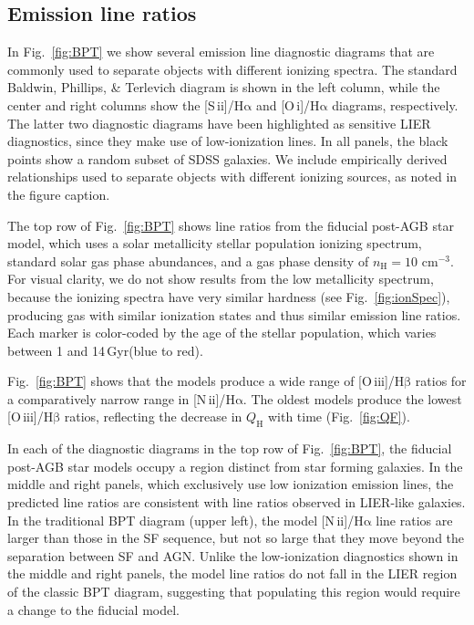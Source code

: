 \documentclass[preprint2]{aastex62}
\newcommand{\nii}{[N\,{\sc ii}]\xspace}
\newcommand{\sii}{[S\,{\sc ii}]\xspace}
\newcommand{\oiii}{[O\,{\sc iii}]\xspace}
\newcommand{\oi}{[O\,{\sc i}]\xspace}
\newcommand{\ha}{\ensuremath{\mathrm{H\alpha}}\xspace}
\newcommand{\hb}{\ensuremath{\mathrm{H\beta}}\xspace}
\newcommand{\QH}{\ensuremath{Q_{\mathrm{H}}}\xspace}
\newcommand{\Gyr}{$\,$Gyr\xspace}
\begin{document}
\subsection{Emission line ratios} \label{sec:stars:ratios}

In Fig.~\ref{fig:BPT} we show several emission line diagnostic diagrams that are commonly used to separate objects with different ionizing spectra. The standard Baldwin, Phillips, \& Terlevich \citep[BPT;][]{BPT} diagram is shown in the left column, while the center and right columns show the \sii/\ha and \oi/\ha diagrams, respectively. The latter two diagnostic diagrams have been highlighted as sensitive LIER diagnostics, since they make use of low-ionization lines. In all panels, the black points show a random subset of SDSS galaxies. We include empirically derived relationships used to separate objects with different ionizing sources, as noted in the figure caption. 

The top row of Fig.~\ref{fig:BPT} shows line ratios from the fiducial post-AGB star model, which uses a solar metallicity stellar population ionizing spectrum, standard solar gas phase abundances, and a gas phase density of $n_{\mathrm{H}}=10$ cm$^{-3}$. For visual clarity, we do not show results from the low metallicity spectrum, because the ionizing spectra have very similar hardness (see Fig.~\ref{fig:ionSpec}), producing gas with similar ionization states and thus similar emission line ratios. Each marker is color-coded by the age of the stellar population, which varies between 1 and 14\Gyr (blue to red). 

Fig.~\ref{fig:BPT} shows that the models produce a wide range of \oiii/\hb ratios for a comparatively narrow range in \nii/\ha. The oldest models produce the lowest \oiii/\hb ratios, reflecting the decrease in \QH with time (Fig.~\ref{fig:QF}).

In each of the diagnostic diagrams in the top row of Fig.~\ref{fig:BPT}, the fiducial post-AGB star models occupy a region distinct from star forming galaxies. In the middle and right panels, which exclusively use low ionization emission lines, the predicted line ratios are consistent with line ratios observed in LIER-like galaxies. In the traditional BPT diagram (upper left), the model \nii/\ha line ratios are larger than those in the SF sequence, but not so large that they move beyond the separation between SF and AGN. Unlike the low-ionization diagnostics shown in the middle and right panels, the model line ratios do not fall in the LIER region of the classic BPT diagram, suggesting that populating this region would require a change to the fiducial model.
\end{document}
